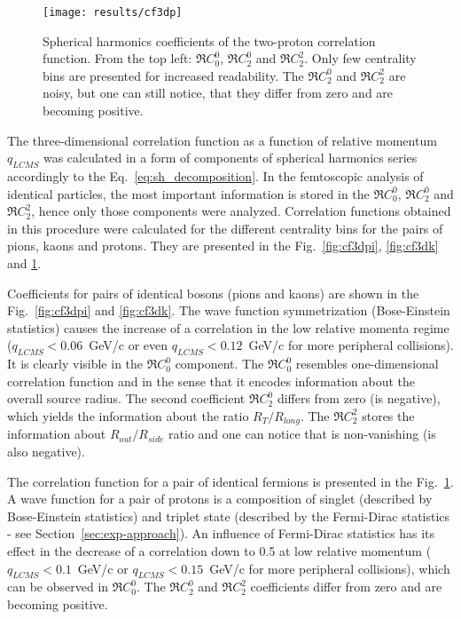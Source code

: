      \begin{figure}[b]
        \centering
        \centerline{\texttt{[image: results/cf3dp]}}
        \caption{Spherical harmonics coefficients of the two-proton correlation function. From the top left: $\Re C^0_0$, $\Re C^0_2$ and $\Re C^2_2$. Only few centrality bins are presented for increased readability. The $\Re C^0_2$ and $\Re C^2_2$ are noisy, but one can still notice, that they differ from zero and are becoming positive.}
      \label{fig:cf3dp}
      \end{figure}

      The three-dimensional correlation function as a function of relative momentum $q_{LCMS}$ was calculated in a form of components of spherical harmonics series accordingly to the Eq.~\ref{eq:sh_decomposition}.
      In the femtoscopic analysis of identical particles, the most important information is stored in the $\Re C^0_0$, $\Re C^0_2$ and $\Re C^2_2$, hence only those components were analyzed.
      Correlation functions obtained in this procedure were calculated for the different centrality bins for the pairs of pions, kaons and protons.
      They are presented in the Fig.~\ref{fig:cf3dpi}, \ref{fig:cf3dk} and \ref{fig:cf3dp}.
      
      Coefficients for pairs of identical bosons (pions and kaons) are shown in the Fig.~\ref{fig:cf3dpi} and \ref{fig:cf3dk}.
      The wave function symmetrization (Bose-Einstein statistics) causes the increase of a correlation in the low relative momenta regime ($q_{LCMS}<0.06$~GeV/c or even $q_{LCMS}<0.12$~GeV/c for more peripheral collisions).
      It is clearly visible in the $\Re C^0_0$ component.
      The $\Re C_0^0$ resembles one-dimensional correlation function and in the sense that it encodes information about the overall source radius.
      The second coefficient $\Re C^0_2$ differs from zero (is negative), which yields the information about the ratio $R_T / R_{long}$.
      The $\Re C^2_2$ stores the information about $R_{out} / R_{side}$ ratio and one can notice that is non-vanishing (is also negative).

      The correlation function for a pair of identical fermions is presented in the Fig.~\ref{fig:cf3dp}.
      A wave function for a pair of protons is a composition of singlet (described by Bose-Einstein statistics) and triplet state (described by the Fermi-Dirac statistics - see Section~\ref{sec:exp-approach}).
      An influence of Fermi-Dirac statistics has its effect in the decrease of a correlation down to 0.5 at low relative momentum ($q_{LCMS}<0.1$~GeV/c or $q_{LCMS}<0.15$~GeV/c for more peripheral collisions), which can be observed in $\Re C^0_0$.
      The $\Re C^0_2$ and $\Re C^2_2$ coefficients differ from zero and are becoming positive.

